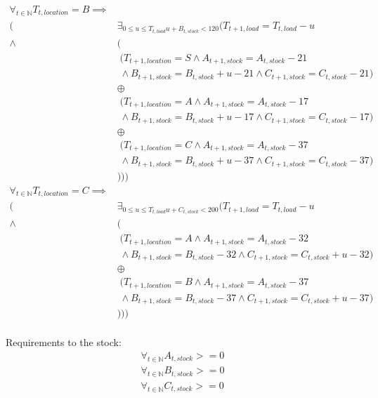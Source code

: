\begin{align*}
 \forall_{t \in \mathbb{N}}T_{t,location}=B \implies& \\
 				  (&\exists_{0 \le u \le T_{t,load}u+B_{t,stock}<120}( T_{t+1,load} = T_{t,load}-u \\
		   \land  &( \\
		   &\; (T_{t+1,location}=S \land A_{t+1,stock} = A_{t,stock}-21 \\
		   &\;\land B_{t+1,stock} = B_{t,stock}+u-21 \land C_{t+1,stock} = C_{t,stock}-21) \\
		   &\oplus \\
		   &\;(T_{t+1,location}=A \land A_{t+1,stock} = A_{t,stock}-17 \\
		   &\;\land B_{t+1,stock} = B_{t,stock}+u-17 \land C_{t+1,stock} = C_{t,stock}-17) \\
           &\oplus \\
           &\;(T_{t+1,location}=C \land A_{t+1,stock} = A_{t,stock}-37 \\
           &\;\land B_{t+1,stock} = B_{t,stock}+u-37 \land C_{t+1,stock} = C_{t,stock}-37) \\
           &))) \\
 \forall_{t \in \mathbb{N}}T_{t,location}=C \implies& \\
 				  (&\exists_{0 \le u \le T_{t,load}u+C_{t,stock}<200}( T_{t+1,load} = T_{t,load}-u \\
		   \land  &( \\
		   &\; (T_{t+1,location}=A \land A_{t+1,stock} = A_{t,stock}-32 \\
		   &\; \land B_{t+1,stock} = B_{t,stock}-32 \land C_{t+1,stock} = C_{t,stock}+u-32) \\
		   &\oplus \\
		   &\; (T_{t+1,location}=B \land A_{t+1,stock} = A_{t,stock}-37 \\
		   &\; \land B_{t+1,stock} = B_{t,stock}-37 \land C_{t+1,stock} = C_{t,stock}+u-37) \\
		   &))) \\
\end{align*}

Requirements to the stock:
\begin{align*}
\forall_{t\in \mathbb{N}}A_{t,stock} >= 0 \\
\forall_{t\in \mathbb{N}}B_{t,stock} >= 0 \\
\forall_{t\in \mathbb{N}}C_{t,stock} >= 0 \\ 
\end{align*}


